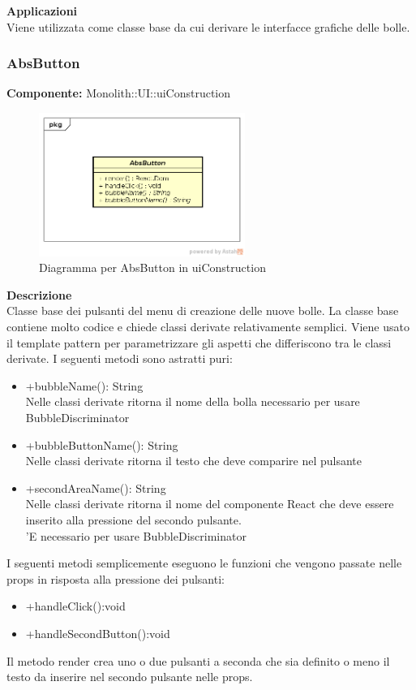 \textbf{Applicazioni}\\
Viene utilizzata come classe base da cui derivare le interfacce grafiche delle bolle. 


\clearpage

\subsubsection{AbsButton}
\textbf{Componente:}  Monolith::UI::uiConstruction\\
   \FloatBarrier
   \begin{figure}[ht]
   \centering
   \includegraphics[width=0.6\textwidth]{img/single-AbsButton.png}
   \caption{{Diagramma per AbsButton in uiConstruction}}
\end{figure}
\FloatBarrier
\textbf{Descrizione}\\
Classe base dei pulsanti del menu di creazione delle nuove bolle. La classe base contiene molto codice e chiede classi derivate relativamente semplici. Viene usato il template pattern per parametrizzare gli aspetti che differiscono tra le classi derivate.
I seguenti metodi sono astratti puri:
\begin{itemize}
\item +bubbleName(): String \\
Nelle classi derivate ritorna il nome della bolla necessario per usare BubbleDiscriminator
\item +bubbleButtonName(): String \\
Nelle classi derivate ritorna il testo che deve comparire nel pulsante
\item +secondAreaName(): String \\
Nelle classi derivate ritorna il nome del componente React che deve essere inserito alla pressione del secondo pulsante. \\'E necessario per usare BubbleDiscriminator
\end{itemize}
I seguenti metodi semplicemente eseguono le funzioni che vengono passate nelle props in risposta alla pressione dei pulsanti:
\begin{itemize}
\item +handleClick():void
\item +handleSecondButton():void
\end{itemize}
Il metodo render crea uno o due pulsanti a seconda che sia definito o meno il testo da inserire nel secondo pulsante nelle props.

